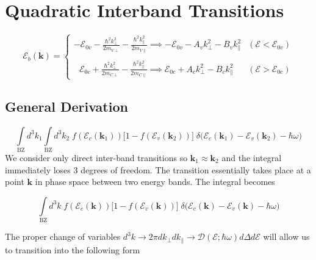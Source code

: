 \newpage
\section{Quadratic Interband Transitions}
\label{app:quadratic_interband_transitions}

\begin{equation}
\mathcal{E}_{b}(\mathbf{k})  = \begin{cases}
-\mathcal{E}_{0v} - \frac{{\hbar ^{2}k_{\perp}^{2}}}{2m_{V \perp}} - \frac{{\hbar ^{2}k_{\parallel}^{2}}}{2m_{V \parallel}} \implies-\mathcal{E}_{0 v}-A_{v}k_{\perp}^{2}-B_{v}k_{\parallel}^{2}  &(\mathcal{E}<\mathcal{E}_{0v})\\ \\ 
\ \ \ \mathcal{E}_{0 c} + \frac{{\hbar ^{2}k_{\perp}^{2}}}{2m_{C \perp}} - \frac{{\hbar ^{2}k_{\parallel}^{2}}}{2m_{C \parallel}} \implies\mathcal{E}_{0 c}+A_{c}k_{\perp}^{2}-B_{c}k_{\parallel}^{2} &(\mathcal{E}>\mathcal{E}_{0c})
\end{cases} 
\label{eq:quadratic_interband_bands}
\end{equation}

\subsection{General Derivation}

\begin{equation}
\int\limits_{\text{BZ}} d^{3}k_{1} \int\limits_{\text{BZ}} d^{3}k_{2} \; f(\mathcal{E}_{c}(\mathbf{k}_{1})) \Big[1-f(\mathcal{E}_{v}(\mathbf{k}_{2}))\Big] \; \delta\Big(\mathcal{E}_{c}(\mathbf{k}_{1}) - \mathcal{E}_{v}(\mathbf{k}_{2}) - \hbar\omega  \Big)
\label{eq:quadratic_interband_double_integral}
\end{equation}
We consider only direct inter-band transitions so $\mathbf{k}_{1}\approx\mathbf{k}_{2}$ and the integral immediately loses 3 degrees of freedom. The transition essentially takes place at a point $\mathbf{k}$ in phase space between two energy bands. The integral becomes

\begin{equation}
\int\limits_{\text{BZ}} d^{3}k \; f(\mathcal{E}_{c}(\mathbf{k})) \Big[1-f(\mathcal{E}_{v}(\mathbf{k}))\Big] \; \delta\Big(\mathcal{E}_{c}(\mathbf{k}) - \mathcal{E}_{v}(\mathbf{k}) - \hbar\omega  \Big)
\label{eq:quadratic_interband_single_integral}
\end{equation}

The proper change of variables
$d^{3}k  \to 2\pi dk_{\perp}dk_{\parallel} \to  \mathcal{D}(\mathcal{E;\hbar\omega})d\Delta d\mathcal{E}$ will allow us to transition into the following form

